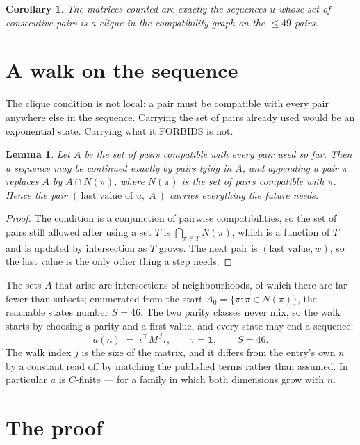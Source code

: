 \documentclass[11pt,a4paper]{article}
\theoremstyle{plain}
\newtheorem{lemma}[theorem]{Lemma}
\newtheorem{corollary}[theorem]{Corollary}
\theoremstyle{definition}
\begin{document}
\begin{corollary}
The matrices counted are exactly the sequences $u$ whose set of consecutive pairs is a clique in
the compatibility graph on the $\le 49$ pairs.
\end{corollary}

\section{A walk on the sequence}

The clique condition is not local: a pair must be compatible with every pair anywhere else in
the sequence. Carrying the set of pairs already used would be an exponential state. Carrying
what it FORBIDS is not.

\begin{lemma}\label{lem:lump}
Let $A$ be the set of pairs compatible with every pair used so far. Then a sequence may be
continued exactly by pairs lying in $A$, and appending a pair $\pi$ replaces $A$ by
$A\cap N(\pi)$, where $N(\pi)$ is the set of pairs compatible with $\pi$. Hence the pair
$(\,\text{last value of }u,\;A\,)$ carries everything the future needs.
\end{lemma}

\begin{proof}
The condition is a conjunction of pairwise compatibilities, so the set of pairs still allowed
after using a set $T$ is $\bigcap_{\pi\in T}N(\pi)$, which is a function of $T$ and is updated
by intersection as $T$ grows. The next pair is $(\text{last value},w)$, so the last value is
the only other thing a step needs.
\end{proof}

The sets $A$ that arise are intersections of neighbourhoods, of which there are far fewer than
subsets; enumerated from the start $A_0=\{\pi:\pi\in N(\pi)\}$, the reachable states number
$S=46$. The two parity classes never mix, so the walk starts by choosing a parity and a first
value, and every state may end a sequence:
\[
a(n)\;=\;\iota^{\!\top}M^{\,j}\tau ,\qquad \tau=\mathbf{1},\qquad S=46.
\]
The walk index $j$ is the size of the matrix, and it differs from the entry's own $n$ by a
constant read off by matching the published terms rather than assumed. In particular $a$ is
$C$-finite --- for a family in which both dimensions grow with $n$.

\section{The proof}
\end{document}
